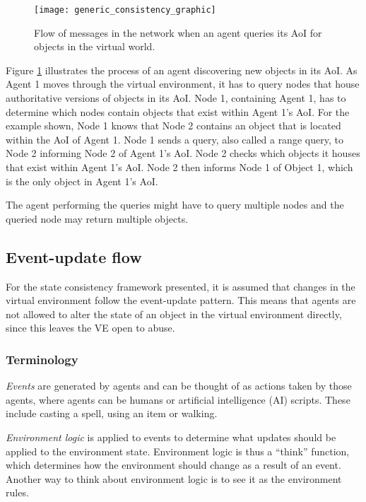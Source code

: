 \begin{figure}[htbp]
 \centering
 \texttt{[image: generic\_consistency\_graphic]}
 \caption{Flow of messages in the network when an agent queries its AoI for objects in the virtual world.}
 \label{fig_query_flow_graphic}
\end{figure}
%
Figure \ref{fig_query_flow_graphic} illustrates the process of an agent discovering new objects in its AoI. As Agent 1 moves through the virtual environment, it has to query nodes that house authoritative versions of objects in its AoI. Node 1, containing Agent 1, has to determine which nodes contain objects that exist within Agent 1's AoI. For the example shown, Node 1 knows that Node 2 contains an object that is located within the AoI of Agent 1. Node 1 sends a query, also called a range query, to Node 2 informing Node 2 of Agent 1's AoI. Node 2 checks which objects it houses that exist within Agent 1's AoI. Node 2 then informs Node 1 of Object 1, which is the only object in Agent 1's AoI.

The agent performing the queries might have to query multiple nodes and the queried node may return multiple objects.

\subsection{Event-update flow}
\label{event_logic_update}

For the state consistency framework presented, it is assumed that changes in the virtual environment follow the event-update pattern. This means that agents are not allowed to alter the state of an object in the virtual environment directly, since this leaves the VE open to abuse.

\subsubsection{Terminology}
\emph{Events} are generated by agents and can be thought of as actions taken by those agents, where agents can be humans or artificial intelligence (AI) scripts. These include casting a spell, using an item or walking.

\emph{Environment logic} is applied to events to determine what updates should be applied to the environment state. Environment logic is thus a ``think'' function, which determines how the environment should change as a result of an event. Another way to think about environment logic is to see it as the environment rules.

